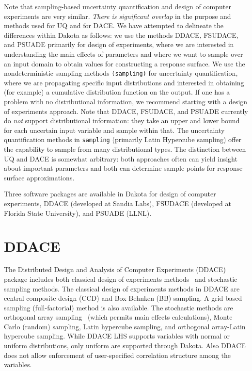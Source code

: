 Note that sampling-based uncertainty quantification and design of
computer experiments are very similar. \emph{There is significant
overlap} in the purpose and methods used for UQ and for DACE. We have
attempted to delineate the differences within Dakota as follows: we
use the methods DDACE, FSUDACE, and PSUADE primarily for design of
experiments, where we are interested in understanding the main effects
of parameters and where we want to sample over an input domain to
obtain values for constructing a response surface. We use the
nondeterministic sampling methods \texttt{(sampling)} for
uncertainty quantification, where we are propagating specific input
distributions and interested in obtaining (for example) a cumulative
distribution function on the output. If one has a problem with no
distributional information, we recommend starting with a design of
experiments approach. Note that DDACE, FSUDACE, and PSUADE currently
do \emph{not} support distributional information: they take an upper
and lower bound for each uncertain input variable and sample within
that. The uncertainty quantification methods in
\texttt{sampling} (primarily Latin Hypercube sampling) offer the
capability to sample from many distributional types. The distinction
between UQ and DACE is somewhat arbitrary: both approaches often can
yield insight about important parameters and both can determine sample
points for response surface approximations.

Three software packages are available in Dakota for design of computer
experiments, DDACE (developed at Sandia Labs), FSUDACE (developed at
Florida State University), and PSUADE (LLNL).

\section{DDACE}\label{dace:ddace}

The Distributed Design and Analysis of Computer Experiments (DDACE)
package includes both classical design of experiments
methods~\cite{TonXX} and stochastic sampling methods. The classical
design of experiments methods in DDACE are central composite design
(CCD) and Box-Behnken (BB) sampling. A grid-based sampling
(full-factorial) method is also available. The stochastic methods are
orthogonal array sampling~\cite{Koe96} (which permits main effects
calculations), Monte Carlo (random) sampling, Latin hypercube
sampling, and orthogonal array-Latin hypercube sampling. While DDACE
LHS supports variables with normal or uniform distributions, only
uniform are supported through Dakota. Also DDACE does not allow
enforcement of user-specified correlation structure among the
variables.

